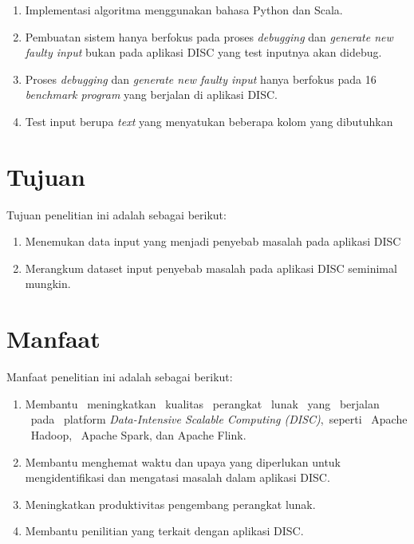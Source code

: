 \begin{enumerate}[nolistsep]

  \item Implementasi algoritma menggunakan bahasa Python dan Scala.

  \item Pembuatan sistem hanya berfokus pada proses \emph{debugging} dan \emph{generate new faulty input} bukan pada aplikasi DISC yang test inputnya akan didebug.

  \item Proses \emph{debugging} dan \emph{generate new faulty input} hanya berfokus pada 16 \emph{benchmark program} yang berjalan di aplikasi DISC. 

  \item Test input berupa \emph{text} yang menyatukan beberapa kolom yang dibutuhkan

\end{enumerate}

\section{Tujuan}
\label{sec:Tujuan}

Tujuan penelitian ini adalah sebagai berikut:

\begin{enumerate}[nolistsep]

  \item Menemukan data input yang menjadi penyebab masalah pada aplikasi DISC

  \item Merangkum dataset input penyebab masalah pada aplikasi DISC seminimal mungkin.

\end{enumerate}

\section{Manfaat}
\label{sec:Manfaat}

Manfaat penelitian ini adalah sebagai berikut:

\begin{enumerate}[nolistsep]
  \item Membantu \ meningkatkan \ kualitas \  perangkat \  lunak \ yang \  berjalan \ pada \ platform \emph{Data-Intensive Scalable Computing (DISC)},\  seperti \ Apache \ Hadoop, \ Apache Spark, dan Apache Flink.
  \item Membantu menghemat waktu dan upaya yang diperlukan untuk mengidentifikasi dan mengatasi masalah dalam aplikasi DISC.
  \item Meningkatkan produktivitas pengembang perangkat lunak.
  \item Membantu penilitian yang terkait dengan aplikasi DISC.

\end{enumerate}
